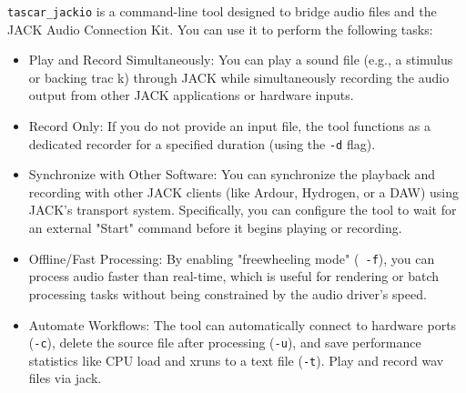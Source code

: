 {\tt tascar\_jackio} is a command-line tool designed to bridge audio
files and the JACK Audio Connection Kit. You can use it to perform the
following tasks:

\begin{itemize}
\item Play and Record Simultaneously: You can play a sound file (e.g.,
  a stimulus or backing trac k) through JACK while simultaneously
  recording the audio output from other JACK applications or hardware
  inputs.
\item Record Only: If you do not provide an input file, the tool
  functions as a dedicated recorder for a specified duration (using
  the {\tt -d} flag).
\item Synchronize with Other Software: You can synchronize the
  playback and recording with other JACK clients (like Ardour,
  Hydrogen, or a DAW) using JACK's transport system. Specifically, you
  can configure the tool to wait for an external "Start" command
  before it begins playing or recording.
\item Offline/Fast Processing: By enabling "freewheeling mode" ({\tt
    -f}), you can process audio faster than real-time, which is useful
  for rendering or batch processing tasks without being constrained by
  the audio driver's speed.
\item Automate Workflows: The tool can automatically connect to
  hardware ports ({\tt -c}), delete the source file after processing
  ({\tt -u}), and save performance statistics like CPU load and xruns
  to a text file ({\tt -t}).  Play and record wav files via jack.
\end{itemize}
